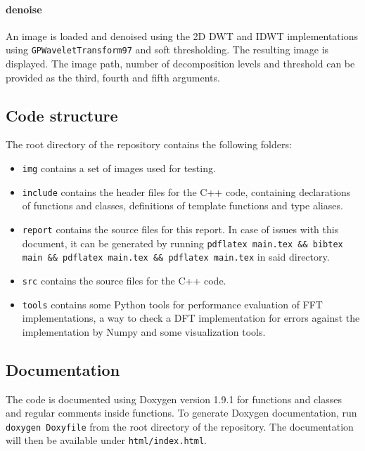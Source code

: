 \paragraph{denoise} An image is loaded and denoised using the 2D DWT and IDWT implementations using \texttt{GPWaveletTransform97} and soft thresholding. The resulting image is displayed. The image path, number of decomposition levels and threshold can be provided as the third, fourth and fifth arguments.

\subsection{Code structure}
The root directory of the repository contains the following folders:
\begin{itemize}
    \item \texttt{img} contains a set of images used for testing.
    \item \texttt{include} contains the header files for the C++ code, containing declarations of functions and classes, definitions of template functions and type aliases.
    \item \texttt{report} contains the source files for this report. In case of issues with this document, it can be generated by running \texttt{pdflatex main.tex \&\& bibtex main \&\& pdflatex main.tex \&\& pdflatex main.tex} in said directory.
    \item \texttt{src} contains the source files for the C++ code.
    \item \texttt{tools} contains some Python tools for performance evaluation of FFT implementations, a way to check a DFT implementation for errors against the implementation by Numpy and some visualization tools.
\end{itemize}

\subsection{Documentation}
The code is documented using Doxygen version 1.9.1 for functions and classes and regular comments inside functions. To generate Doxygen documentation, run \texttt{doxygen Doxyfile} from the root directory of the repository. The documentation will then be available under \texttt{html/index.html}.